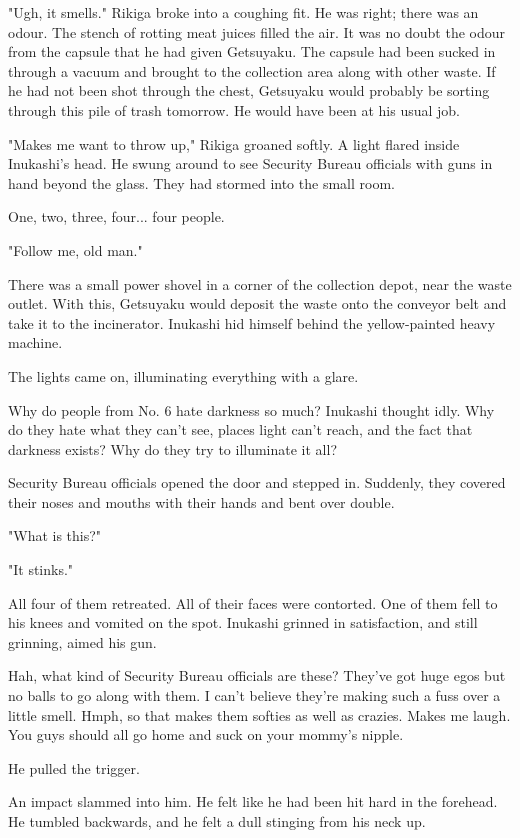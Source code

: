 "Ugh, it smells." Rikiga broke into a coughing fit. He was right; there
was an odour. The stench of rotting meat juices filled the air. It was
no doubt the odour from the capsule that he had given Getsuyaku. The
capsule had been sucked in through a vacuum and brought to the
collection area along with other waste. If he had not been shot through
the chest, Getsuyaku would probably be sorting through this pile of
trash tomorrow. He would have been at his usual job.

"Makes me want to throw up," Rikiga groaned softly. A light flared
inside Inukashi's head. He swung around to see Security Bureau officials
with guns in hand beyond the glass. They had stormed into the small
room.

One, two, three, four... four people.

"Follow me, old man."

There was a small power shovel in a corner of the collection depot, near
the waste outlet. With this, Getsuyaku would deposit the waste onto the
conveyor belt and take it to the incinerator. Inukashi hid himself
behind the yellow-painted heavy machine.

The lights came on, illuminating everything with a glare.

Why do people from No. 6 hate darkness so much? Inukashi thought idly.
Why do they hate what they can't see, places light can't reach, and the
fact that darkness exists? Why do they try to illuminate it all?

Security Bureau officials opened the door and stepped in. Suddenly, they
covered their noses and mouths with their hands and bent over double.

"What is this?"

"It stinks."

All four of them retreated. All of their faces were contorted. One of
them fell to his knees and vomited on the spot. Inukashi grinned in
satisfaction, and still grinning, aimed his gun.

Hah, what kind of Security Bureau officials are these? They've got huge
egos but no balls to go along with them. I can't believe they're making
such a fuss over a little smell. Hmph, so that makes them softies as
well as crazies. Makes me laugh. You guys should all go home and suck on
your mommy's nipple.

He pulled the trigger.

An impact slammed into him. He felt like he had been hit hard in the
forehead. He tumbled backwards, and he felt a dull stinging from his
neck up.

